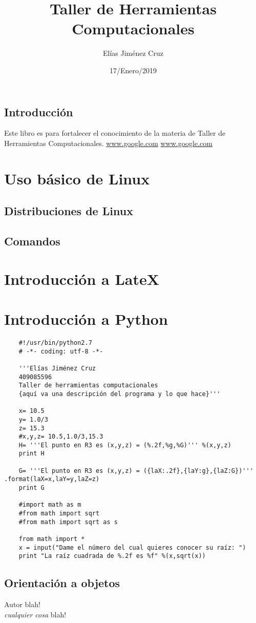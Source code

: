 \documentclass{book}
\title{Taller de Herramientas Computacionales}
\author{Elías Jiménez Cruz}
\date{17/Enero/2019}
\begin{document}
	\maketitle
	\tableofcontents
	\section*{Introducción} Este libro es para fortalecer el conocimiento de la materia de Taller de Herramientas Computacionales.
	\url{www.google.com}
	\hyperref[Google]{www.google.com}
	
	\chapter{Uso básico de Linux}
	\section{Distribuciones de Linux}
	\section{Comandos}
	\chapter{Introducción a LateX}
	\chapter{Introducción a Python}
	\begin{verbatim}
	#!/usr/bin/python2.7
	# -*- coding: utf-8 -*-
	
	'''Elías Jiménez Cruz
	409085596
	Taller de herramientas computacionales
	{aquí va una descripción del programa y lo que hace}'''
	
	x= 10.5
	y= 1.0/3
	z= 15.3
	#x,y,z= 10.5,1.0/3,15.3
	H= '''El punto en R3 es (x,y,z) = (%.2f,%g,%G)''' %(x,y,z)
	print H
	
	G= '''El punto en R3 es (x,y,z) = ({laX:.2f},{laY:g},{laZ:G})''' .format(laX=x,laY=y,laZ=z)
	print G
	
	#import math as m
	#from math import sqrt
	#from math import sqrt as s
	
	from math import *
	x = input("Dame el número del cual quieres conocer su raíz: ")
	print "La raíz cuadrada de %.2f es %f" %(x,sqrt(x))
	\end{verbatim}
	
	\section*{Orientación a objetos}
	
	\begin{thebibliography}{9}
		Autor blah!\\
		\textit{cualquier cosa}
		blah!
	\end{thebibliography}
\end{document}
